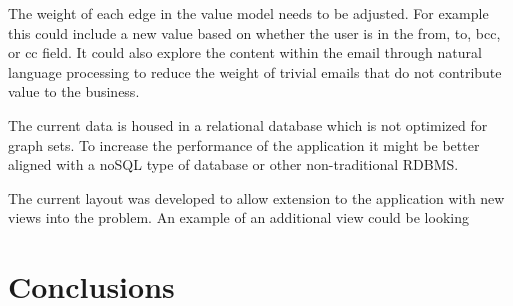 \documentclass[journal]{vgtc}                %
\begin{document}
The weight of each edge in the value model needs to be adjusted.  For example this could include a new value based on whether the user is in the from, to, bcc, or cc field.  It could also explore the content within the email through natural language processing to reduce the weight of trivial emails that do not contribute value to the business.

The current data is housed in a relational database which is not optimized for graph sets.  To increase the performance of the application it might be better aligned with a noSQL type of database or other non-traditional RDBMS.

The current layout was developed to allow extension to the application with new views into the problem.  An example of an additional view could be looking 

\section{Conclusions}
\end{document}
